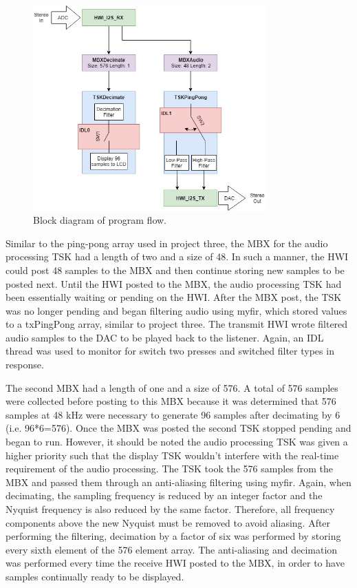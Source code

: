 \documentclass[11pt,pdftex,portrait,letterpaper]{article}
\begin{document}
\begin{figure}[h]
\centering
\includegraphics[width=0.8\textwidth]{./blocks}
\caption{Block diagram of program flow.}
\label{f:fig2}
\end{figure}

Similar to the ping-pong array used in project three, the MBX for the audio processing TSK had a length of two and a size of 48. In such a manner, the HWI could post 48 samples to the MBX and then continue storing new samples to be posted next. Until the HWI posted to the MBX, the audio processing TSK had been essentially waiting or pending on the HWI. After the MBX post, the TSK was no longer pending and began filtering audio using myfir, which stored values to a txPingPong array, similar to project three. The transmit HWI wrote filtered audio samples to the DAC to be played back to the listener. Again, an IDL thread was used to monitor for switch two presses and switched filter types in response.

The second MBX had a length of one and a size of 576. A total of 576 samples were collected before posting to this MBX because it was determined that 576 samples at 48 kHz were necessary to generate 96 samples after decimating by 6 (i.e. 96*6=576). Once the MBX was posted the second TSK stopped pending and began to run. However, it should be noted the audio processing TSK was given a higher priority such that the display TSK wouldn't interfere with the real-time requirement of the audio processing. The TSK took the 576 samples from the MBX and passed them through an anti-aliasing filtering using myfir. Again, when decimating, the sampling frequency is reduced by an integer factor and the Nyquist frequency is also reduced by the same factor. Therefore, all frequency components above the new Nyquist must be removed to avoid aliasing. After performing the filtering, decimation by a factor of six was performed by storing every sixth element of the 576 element array. The anti-aliasing and decimation was performed every time the receive HWI posted to the MBX, in order to have samples continually ready to be displayed.
\end{document}
